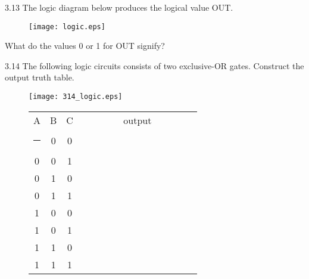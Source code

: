 \documentclass{patt}
\begin{document}
\begin{exercises}

\item[3.13] The logic diagram below produces the logical
value OUT.
\vspace{0.25in}
 
\begin{figure}[h]
\centering
\texttt{[image: logic.eps]}
\end{figure}

\vspace{.25in}

What do the values 0 or 1 for OUT signify?

\pagebreak

\item[3.14] The following logic circuits consists of two exclusive-OR gates.
Construct the output truth table.

\makeatletter
\def\hlinewd#1{%
\noalign{\ifnum0=`}\fi\hrule \@height #1 \futurelet
\reserved@a\@xhline}
\makeatother

\vspace{.2in}

\begin{figure}[h]
\begin{minipage}[c]{.3\textwidth}
\vspace{0pt}
\begin{center}
\texttt{[image: 314\_logic.eps]}
\end{center}
\end{minipage}\hfill
\begin{minipage}[c]{.3\textwidth}
\vspace{0pt}
\begin{tabular}{|c|c|c||c|}
A&B&C&output \\ \hlinewd{2pt}
0&0&0& \ \ \ \ \ \ \ \ \ \ \ \ \ \ \ \ \ \ \ \ \ \ \ \\ \hline 
0&0&1& \\ \hline 
0&1&0& \\ \hline 
0&1&1& \\ \hline 
1&0&0& \\ \hline 
1&0&1& \\ \hline 
1&1&0& \\ \hline 
1&1&1& \\ \hline 
\end{tabular}
\end{minipage}
\end{figure}



\end{exercises}
\end{document}

